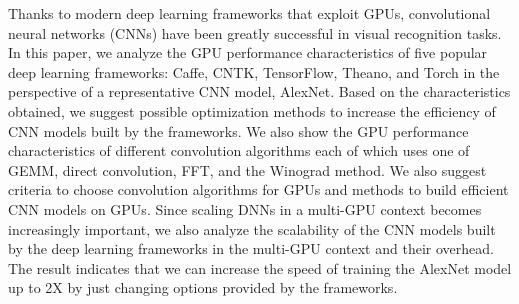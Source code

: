 Thanks to modern deep learning frameworks that exploit GPUs, convolutional neural networks (CNNs) have been greatly successful in visual recognition tasks. In this paper, we analyze the GPU performance characteristics of five popular deep learning frameworks: Caffe, CNTK, TensorFlow, Theano, and Torch in the perspective of a representative CNN model, AlexNet. 
Based on the characteristics obtained, we suggest possible optimization methods to increase the efficiency of CNN models built by the frameworks. We also show the GPU performance characteristics of different convolution algorithms each of which uses one of GEMM, direct convolution, FFT, and the Winograd method. We also suggest criteria to choose convolution algorithms for GPUs and methods to build efficient CNN models on GPUs. Since scaling DNNs in a multi-GPU context becomes increasingly important, we also analyze the scalability of the CNN models built by the deep learning frameworks in the multi-GPU context and their overhead. The result indicates that we can increase the speed of training the AlexNet model up to 2X by just changing options provided by the frameworks. 